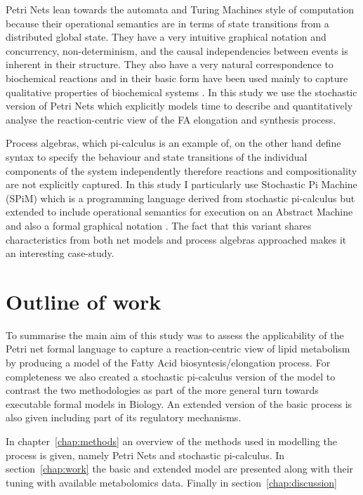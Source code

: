 Petri Nets lean towards the automata and Turing Machines style of
computation because their operational semantics are in terms of state
transitions from a distributed global state. They have a very intuitive
graphical notation and concurrency,
non-determinism, and the causal independencies between events is
inherent in their structure. They
also have a very natural correspondence to biochemical reactions and
in their basic form have been used mainly to capture qualitative properties
of biochemical systems \cite [] {baldan2010petri}. In this study we use the stochastic version of
Petri Nets which explicitly models time to describe and quantitatively
analyse the
reaction-centric view of the FA elongation and synthesis
process.

Process algebras, which pi-calculus is an example of, on the other
hand define syntax to specify the behaviour and state transitions of the individual
components of the system independently therefore reactions and
compositionality are not explicitly captured. In this study I
particularly use Stochastic Pi Machine (SPiM) which is a programming
language derived from stochastic pi-calculus but extended to include
operational semantics for execution on an Abstract Machine and also a
formal graphical notation \cite [] {export:65224, export:65223}. The
fact that this variant shares
characteristics from both net models and process algebras approached
makes it an interesting case-study.

\section{Outline of work}
To summarise the main aim of this study was to assess the
applicability of the Petri net formal language to capture a
reaction-centric view of lipid metabolism by producing a model of the
Fatty Acid biosyntesis/elongation process. For completeness we also
created a stochastic pi-calculus version of the model to contrast the
two methodologies as part of the more general turn towards executable
formal models in Biology. An extended version of the basic process is
also given including part of its regulatory mechanisms.

In chapter~\ref{chap:methods} an overview of the methods used in
modelling the process is given, namely Petri Nets and stochastic
pi-calculus. In section~\ref{chap:work} the basic and extended model
are presented along with their tuning with available metabolomics
data. Finally in section~\ref{chap:discussion}


